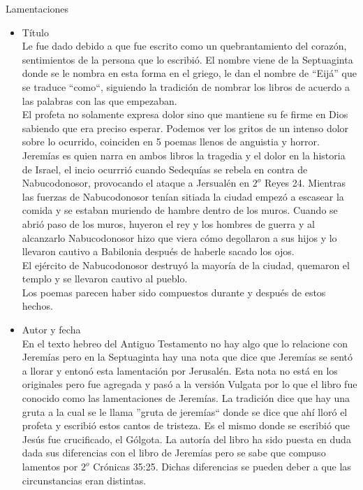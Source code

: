 %
%
\begin{section}{Lamentaciones}
	\begin{itemize}
		\item Título\\
			Le fue dado debido a que fue escrito como un quebrantamiento del corazón, sentimientos de la persona que lo escribió. El nombre viene de la Septuaginta donde se le nombra en esta forma en el griego, le dan el nombre de ``Eijá'' que se traduce ``como``, siguiendo la tradición de nombrar los libros de acuerdo a las palabras con las que empezaban.\\
			El profeta no solamente expresa dolor sino que mantiene su fe firme en Dios sabiendo que era preciso esperar. Podemos ver los gritos de un intenso dolor sobre lo ocurrido, coinciden en 5 poemas llenos de anguistia y horror. Jeremías es quien narra en ambos libros la tragedia y el dolor en la historia de Israel, el incio ocurrrió cuando Sedequías se rebela en contra de Nabucodonosor, provocando el ataque a Jersualén en $2^{o}$ Reyes 24. Mientras las fuerzas de Nabucodonosor tenían sitiada la ciudad empezó a escasear la comida y se estaban muriendo de hambre dentro de los muros. Cuando se abrió paso de los muros, huyeron el rey y los hombres de guerra y al alcanzarlo Nabucodonosor hizo que viera cómo degollaron a sus hijos y lo llevaron cautivo a Babilonia después de haberle sacado los ojos.\\
			El ejército de Nabucodonosor destruyó la mayoría de la ciudad, quemaron el templo y se llevaron cautivo al pueblo.\\
			Los poemas parecen haber sido compuestos durante y después de estos hechos.
		\item Autor y fecha\\
			En el texto hebreo del Antiguo Testamento no hay algo que lo relacione con Jeremías pero en la Septuaginta hay una nota que dice que Jeremías se sentó a llorar y entonó esta lamentación por Jerusalén. Esta nota no está en los originales pero fue agregada y pasó a la versión Vulgata por lo que el libro fue conocido como las lamentaciones de Jeremías. La tradición dice que hay una gruta a la cual se le llama ''gruta de jeremías`` donde se dice que ahí lloró el profeta y escribió estos cantos de tristeza. Es el mismo donde se escribió que Jesús fue crucificado, el Gólgota. La autoría del libro ha sido puesta en duda dada sus diferencias con el libro de Jeremías pero se sabe que compuso lamentos por $2^{o}$ Crónicas 35:25. Dichas diferencias se pueden deber a que las circunstancias eran distintas. \\

\end{itemize}
\end{section}
